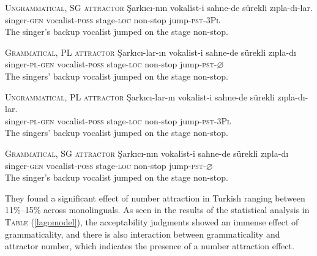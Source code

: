 \documentclass[doc]{apa6}
\begin{document}
\begin{exe}
\ex
\begin{xlist}

\ex \textsc{Ungrammatical, SG attractor} \label{lago4}
\gll \c{S}ark{\i}c{\i}-n{\i}n vokalist-i sahne-de s\"{u}rekli z{\i}pla-d{\i}-lar.\\
singer-\textsc{gen} vocalist-\textsc{poss} stage-\textsc{loc} non-stop jump-\textsc{pst}-\textsc{3Pl}\\
\glt The singer's backup vocalist jumped on the stage non-stop.

\ex \textsc{Grammatical, PL attractor} \label{lago2}
\gll \c{S}ark{\i}c{\i}-lar-{\i}n vokalist-i sahne-de s\"{u}rekli z{\i}pla-d{\i}\\
singer-\textsc{pl}-\textsc{gen} vocalist-\textsc{poss} stage-\textsc{loc} non-stop jump-\textsc{pst}-$\varnothing$\\
\glt The singers' backup vocalist jumped on the stage non-stop.


\ex \textsc{Ungrammatical, PL attractor} \label{lago3}
\gll \c{S}ark{\i}c{\i}-lar-{\i}n vokalist-i sahne-de s\"{u}rekli z{\i}pla-d{\i}-lar.\\
singer-\textsc{pl}-\textsc{gen} vocalist-\textsc{poss} stage-\textsc{loc} non-stop jump-\textsc{pst}-\textsc{3Pl}\\
\glt The singers' backup vocalist jumped on the stage non-stop.

\ex \textsc{Grammatical, SG attractor} \label{lago1}
\gll \c{S}ark{\i}c{\i}-n{\i}n vokalist-i sahne-de s\"{u}rekli z{\i}pla-d{\i}\\
singer-\textsc{gen} vocalist-\textsc{poss} stage-\textsc{loc} non-stop jump-\textsc{pst}-$\varnothing$\\
\glt The singer's backup vocalist jumped on the stage non-stop.

\end{xlist}
\end{exe}

They found a significant effect of number attraction in Turkish ranging
between 11\%--15\% across monolinguals. As seen in the results of the
statistical analysis in \textsc{Table} (\ref{lagomodel}), the
acceptability judgments showed an immense effect of grammaticality, and
there is also interaction between grammaticality and attractor number,
which indicates the presence of a number attraction effect.
\end{document}
